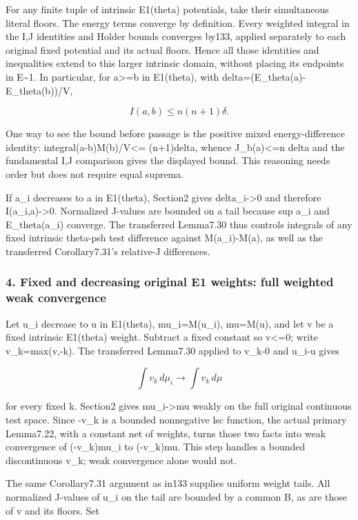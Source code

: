 \documentclass[
]{article}
\begin{document}
For any finite tuple of intrinsic E1(theta) potentials, take their
simultaneous literal floors. The energy terms converge by definition.
Every weighted integral in the I,J identities and Holder bounds
converges by133, applied separately to each original fixed potential and
its actual floors. Hence all those identities and inequalities extend to
this larger intrinsic domain, without placing its endpoints in
E\textasciitilde1. In particular, for a\textgreater=b in E1(theta), with
delta=(E\_theta(a)-E\_theta(b))/V,

\[I(a,b)\le n(n+1)\delta.\]

One way to see the bound before passage is the positive mixed
energy-difference identity: integral(a-b)M(b)/V\textless= (n+1)delta,
whence J\_b(a)\textless=n delta and the fundamental I,J comparison gives
the displayed bound. This reasoning needs order but does not require
equal suprema.

If a\_i decreases to a in E1(theta), Section2 gives
delta\_i-\textgreater0 and therefore I(a\_i,a)-\textgreater0. Normalized
J-values are bounded on a tail because sup a\_i and E\_theta(a\_i)
converge. The transferred Lemma7.30 thus controls integrals of any fixed
intrinsic theta-psh test difference against M(a\_i)-M(a), as well as the
transferred Corollary7.31's relative-J differences.

\subsubsection{4. Fixed and decreasing original E1 weights: full
weighted weak
convergence}\label{fixed-and-decreasing-original-e1-weights-full-weighted-weak-convergence}

Let u\_i decrease to u in E1(theta), mu\_i=M(u\_i), mu=M(u), and let v
be a fixed intrinsic E1(theta) weight. Subtract a fixed constant so
v\textless=0; write v\_k=max(v,-k). The transferred Lemma7.30 applied to
v\_k-0 and u\_i-u gives

\[\int v_k\,d\mu_i\longrightarrow\int v_k\,d\mu\]

for every fixed k. Section2 gives mu\_i-\textgreater mu weakly on the
full original continuous test space. Since -v\_k is a bounded
nonnegative lsc function, the actual primary Lemma7.22, with a constant
net of weights, turns those two facts into weak convergence of
(-v\_k)mu\_i to (-v\_k)mu. This step handles a bounded discontinuous
v\_k; weak convergence alone would not.

The same Corollary7.31 argument as in133 supplies uniform weight tails.
All normalized J-values of u\_i on the tail are bounded by a common B,
as are those of v and its floors. Set
\end{document}
